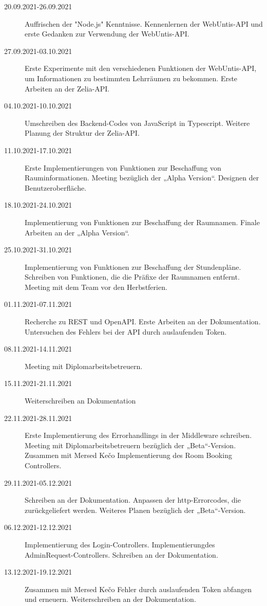 
\begin{description}
    \item[20.09.2021-26.09.2021] Auffrischen der "Node.js" Kenntnisse. Kennenlernen der Web\-Untis-API und erste Gedanken zur Verwendung der WebUntis-API.
    \item[27.09.2021-03.10.2021] Erste Experimente mit den verschiedenen Funktionen der WebUntis-API, um Informationen zu bestimmten Lehrräumen zu bekommen. Erste Arbeiten an der Zelia-API. 
    \item[04.10.2021-10.10.2021] Umschreiben des Backend-Codes von JavaScript in Typescript. Weitere Planung der Struktur der Zelia-API.
    \item[11.10.2021-17.10.2021] Erste Implementierungen von Funktionen zur Beschaffung von Rauminformationen. Meeting bezüglich der „Alpha Version“. Designen der Benutzeroberfläche. 
    \item[18.10.2021-24.10.2021] Implementierung von Funktionen zur Beschaffung der Raumnamen. Finale Arbeiten an der „Alpha Version“.
    \item[25.10.2021-31.10.2021] Implementierung von Funktionen zur Beschaffung der Stundenpläne. Schreiben von Funktionen, die die Präfixe der Raumnamen entfernt. Meeting mit dem Team vor den Herbstferien. 
    \item[01.11.2021-07.11.2021] Recherche zu REST und OpenAPI. Erste Arbeiten an der Dokumentation. Untersuchen des Fehlers bei der API durch auslaufenden Token. 
    \item[08.11.2021-14.11.2021] Meeting mit Diplomarbeitsbetreuern.
    \item[15.11.2021-21.11.2021] Weiterschreiben an Dokumentation
    \item[22.11.2021-28.11.2021] Erste Implementierung des Errorhandlings in der Middleware schreiben. Meeting mit Diplomarbeitsbetreuern bezüglich der „Beta“-Version. Zusammen mit Mersed Kečo Implementierung des Room Booking Controllers.
    \item[29.11.2021-05.12.2021] Schreiben an der Dokumentation. Anpassen der http-Error\-codes, die zurückgeliefert werden. Weiteres Planen bezüglich der „Beta“-Version.
    \item[06.12.2021-12.12.2021] Implementierung des Login-Controllers. Implementierung\linebreak des AdminRequest-Controllers. Schreiben an der Dokumentation. 
    \item[13.12.2021-19.12.2021] Zusammen mit Mersed Kečo Fehler durch auslaufenden Token abfangen und erneuern. Weiterschreiben an der Dokumentation. 

\end{description}
